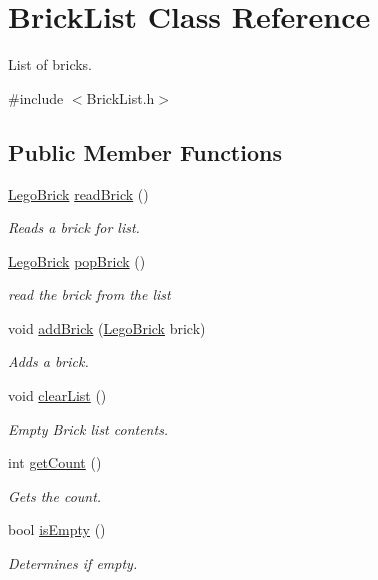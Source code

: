\hypertarget{classBrickList}{}\section{Brick\+List Class Reference}
\label{classBrickList}


List of bricks.  




{\ttfamily \#include $<$Brick\+List.\+h$>$}

\subsection*{Public Member Functions}
\begin{DoxyCompactItemize}
\item 
\hyperlink{classLegoBrick}{Lego\+Brick} \hyperlink{classBrickList_afb572afdc6f9d93b5b8d3b1f3c287ad0}{read\+Brick} ()
\begin{DoxyCompactList}\small\item\em Reads a brick for list. \end{DoxyCompactList}\item 
\hyperlink{classLegoBrick}{Lego\+Brick} \hyperlink{classBrickList_aaa7a914603a66dd21a27517f7ba7e651}{pop\+Brick} ()
\begin{DoxyCompactList}\small\item\em read the brick from the list \end{DoxyCompactList}\item 
void \hyperlink{classBrickList_a93f73c7e29ff71f1097b678d2dff8a01}{add\+Brick} (\hyperlink{classLegoBrick}{Lego\+Brick} brick)
\begin{DoxyCompactList}\small\item\em Adds a brick. \end{DoxyCompactList}\item 
void \hyperlink{classBrickList_a5a273496a69c238fc132b7f02f1fdaa6}{clear\+List} ()\hypertarget{classBrickList_a5a273496a69c238fc132b7f02f1fdaa6}{}\label{classBrickList_a5a273496a69c238fc132b7f02f1fdaa6}

\begin{DoxyCompactList}\small\item\em Empty Brick list contents. \end{DoxyCompactList}\item 
int \hyperlink{classBrickList_a08ee7dae215b091fefb99b99dcb3dfc2}{get\+Count} ()
\begin{DoxyCompactList}\small\item\em Gets the count. \end{DoxyCompactList}\item 
bool \hyperlink{classBrickList_a2fe274f3e5fed4685adbab2ae3665f89}{is\+Empty} ()
\begin{DoxyCompactList}\small\item\em Determines if empty. \end{DoxyCompactList}\end{DoxyCompactItemize}



